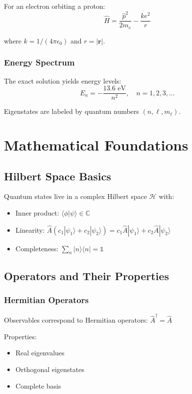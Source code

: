\documentclass[12pt,oneside]{book}
\begin{document}
For an electron orbiting a proton:
$$\hat{H} = \frac{\hat{p}^2}{2m_e} - \frac{ke^2}{r}$$

where $k = 1/(4\pi\epsilon_0)$ and $r = |\mathbf{r}|$.

\subsection{Energy Spectrum}

The exact solution yields energy levels:
$$E_n = -\frac{13.6 \text{ eV}}{n^2}, \quad n = 1,2,3,\ldots$$

Eigenstates are labeled by quantum numbers $(n, \ell, m_\ell)$.

\chapter{Mathematical Foundations}

\section{Hilbert Space Basics}

Quantum states live in a complex Hilbert space $\mathcal{H}$ with:
\begin{itemize}
  \item Inner product: $\langle\phi|\psi\rangle \in \mathbb{C}$
  \item Linearity: $\hat{A}(c_1|\psi_1\rangle + c_2|\psi_2\rangle) = c_1\hat{A}|\psi_1\rangle + c_2\hat{A}|\psi_2\rangle$
  \item Completeness: $\sum_n |n\rangle\langle n| = \mathbb{1}$
\end{itemize}

\section{Operators and Their Properties}

\subsection{Hermitian Operators}

Observables correspond to Hermitian operators: $\hat{A}^\dagger = \hat{A}$

Properties:
\begin{itemize}
  \item Real eigenvalues
  \item Orthogonal eigenstates
  \item Complete basis
\end{itemize}
\end{document}

